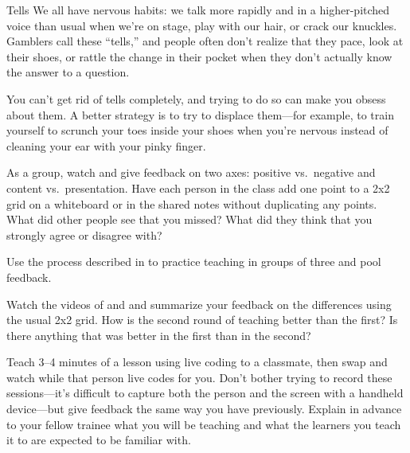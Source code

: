 \begin{aside}{Tells}
  We all have nervous habits:
  we talk more rapidly and in a higher-pitched voice than usual when we're on stage,
  play with our hair,
  or crack our knuckles.
  Gamblers call these ``tells,''
  and people often don't realize that they pace,
  look at their shoes,
  or rattle the change in their pocket
  when they don't actually know the answer to a question.

  You can't get rid of tells completely,
  and trying to do so can make you obsess about them.
  A better strategy is to try to displace them---for example,
  to train yourself to scrunch your toes inside your shoes when you're nervous
  instead of cleaning your ear with your pinky finger.
\end{aside}



As a group,
watch 
and give feedback on two axes:
positive vs.\ negative and content vs.\ presentation.
Have each person in the class add one point to a 2x2 grid on a whiteboard or in the shared notes
without duplicating any points.
What did other people see that you missed?
What did they think that you strongly agree or disagree with?


Use the process described in 
to practice teaching in groups of three
and pool feedback.


Watch the videos of 
and 
and summarize your feedback on the differences using the usual 2x2 grid.
How is the second round of teaching better than the first?
Is there anything that was better in the first than in the second?


Teach 3--4 minutes of a lesson using live coding to a classmate,
then swap and watch while that person live codes for you.
Don't bother trying to record these sessions---it's difficult to capture
both the person and the screen with a handheld device---but
give feedback the same way you have previously.
Explain in advance to your fellow trainee what you will be teaching
and what the learners you teach it to are expected to be familiar with.

